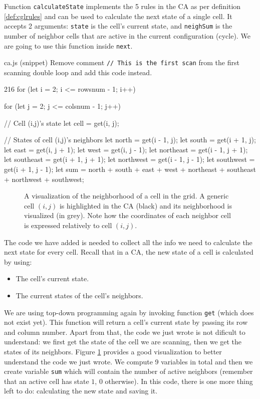 Function \texttt{calculateState} implements the 5 rules in the CA as per definition \ref{def:cglrules} and
can be used to calculate the next state of a single cell.
It accepts 2 arguments: \texttt{state} is the cell's current state, and \texttt{neighSum} is the number of
neighbor cells that are active in the current configuration (cycle).
We are going to use this function inside \texttt{next}.

\begin{programcode}{ca.js (snippet)}
Remove comment \texttt{// This is the first scan} from the first scanning double loop and add this
code instead.
\begin{codeh1}{2}{16}
for (let i = 2; i <= rowsnum - 1; i++) {
  for (let j = 2; j <= colsnum - 1; j++) {
    // Cell (i,j)'s state
    let cell = get(i, j);

    // States of cell (i,j)'s neighbors
    let north = get(i - 1, j);
    let south = get(i + 1, j);
    let east = get(i, j + 1);
    let west = get(i, j - 1);
    let northeast = get(i - 1, j + 1);
    let southeast = get(i + 1, j + 1);
    let northwest = get(i - 1, j - 1);
    let southwest = get(i + 1, j - 1);
    let sum = north + south + east + west + northeast + southeast + northwest + southwest;
  }
}
\end{codeh1}
\end{programcode}

%
\begin{figure}[b]

%
%
\caption[Neighborhood of a cell]{A visualization of the neighborhood of a cell in the grid.
A generic cell $(i,j)$ is highlighted in the CA (black)
and its neighborhood is visualized (in grey).
Note how the coordinates of each neighbor cell is expressed relatively
to cell $(i,j)$.}
\label{fig:cellneigh}
\end{figure}
%

The code we have added is needed to collect all the info we need to calculate the next state for every cell.
Recall that in a CA, the new state of a cell is calculated by using:

\begin{itemize}
\item The cell's current state.
\item The current states of the cell's neighbors.
\end{itemize}

We are using top-down programming again by invoking function \texttt{get} (which does not exist yet). This function
will return a cell's current state by passing its row and column number. Apart from that, the code we
just wrote is not dificult to understand: we first get the state of the cell we are scanning, then we get the states
of its neighbors. Figure \ref{fig:cellneigh} provides a good visualization to better understand the code we just
wrote.
We compute 9 variables in total and then we create variable \texttt{sum} which will
contain the number of active neighbors (remember that an active cell has state $1$, $0$ otherwise). In this
code, there is one more thing left to do: calculating the new state and saving it.

